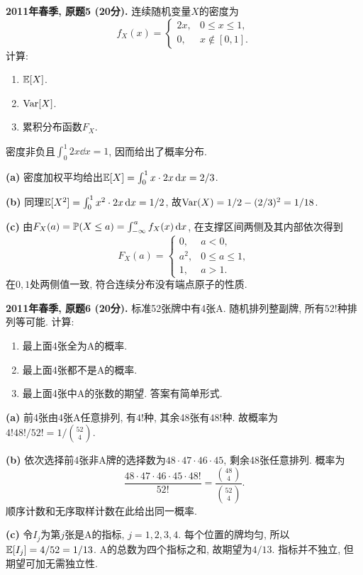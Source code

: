 \begin{exercise}\label{ex:m1-2011s-q5}
\textbf{2011年春季, 原题5 (20分).} 连续随机变量$X$的密度为
\[
f_X(x)=\begin{cases}2x,&0\le x\le1,\\0,&x\notin[0,1].\end{cases}
\]
计算: \begin{enumerate}\item[(a)]\label{ex:m1-2011s-q5-a} $\mathbb E[X]$.\item[(b)]\label{ex:m1-2011s-q5-b} $\operatorname{Var}[X]$.\item[(c)]\label{ex:m1-2011s-q5-c} 累积分布函数$F_X$.\end{enumerate}
\end{exercise}
\begin{solution}
密度非负且$\int_0^1 2x\dd x=1$, 因而给出了概率分布.

\textbf{(a)}\label{sol:m1-2011s-q5-a} 密度加权平均给出$\mathbb E[X]=\int_0^1x\cdot2x\,\mathrm d x=2/3$.

\textbf{(b)}\label{sol:m1-2011s-q5-b} 同理$\mathbb E[X^2]=\int_0^1x^2\cdot2x\,\mathrm d x=1/2$, 故$\operatorname{Var}(X)=1/2-(2/3)^2=1/18$.

\textbf{(c)}\label{sol:m1-2011s-q5-c} 由$F_X(a)=\mathbb P(X\le a)=\int_{-\infty}^a f_X(x)\,\mathrm d x$, 在支撑区间两侧及其内部依次得到
\[
F_X(a)=\begin{cases}0,&a<0,\\a^2,&0\le a\le1,\\1,&a>1.\end{cases}
\]
在$0,1$处两侧值一致, 符合连续分布没有端点原子的性质.
\end{solution}

\begin{exercise}\label{ex:m1-2011s-q6}
\textbf{2011年春季, 原题6 (20分).} 标准52张牌中有4张A. 随机排列整副牌, 所有$52!$种排列等可能. 计算:
\begin{enumerate}\item[(a)]\label{ex:m1-2011s-q6-a} 最上面4张全为A的概率.\item[(b)]\label{ex:m1-2011s-q6-b} 最上面4张都不是A的概率.\item[(c)]\label{ex:m1-2011s-q6-c} 最上面4张中A的张数的期望. 答案有简单形式.\end{enumerate}
\end{exercise}
\begin{solution}
\textbf{(a)}\label{sol:m1-2011s-q6-a} 前4张由4张A任意排列, 有$4!$种, 其余48张有$48!$种. 故概率为$4!48!/52!=1/\binom{52}{4}$.

\textbf{(b)}\label{sol:m1-2011s-q6-b} 依次选择前4张非A牌的选择数为$48\cdot47\cdot46\cdot45$, 剩余48张任意排列. 概率为
\[
\frac{48\cdot47\cdot46\cdot45\cdot48!}{52!}
=\frac{\binom{48}{4}}{\binom{52}{4}}.
\]
顺序计数和无序取样计数在此给出同一概率.

\textbf{(c)}\label{sol:m1-2011s-q6-c} 令$I_j$为第$j$张是A的指标, $j=1,2,3,4$. 每个位置的牌均匀, 所以$\mathbb E[I_j]=4/52=1/13$. A的总数为四个指标之和, 故期望为$4/13$. 指标并不独立, 但期望可加无需独立性.
\end{solution}

